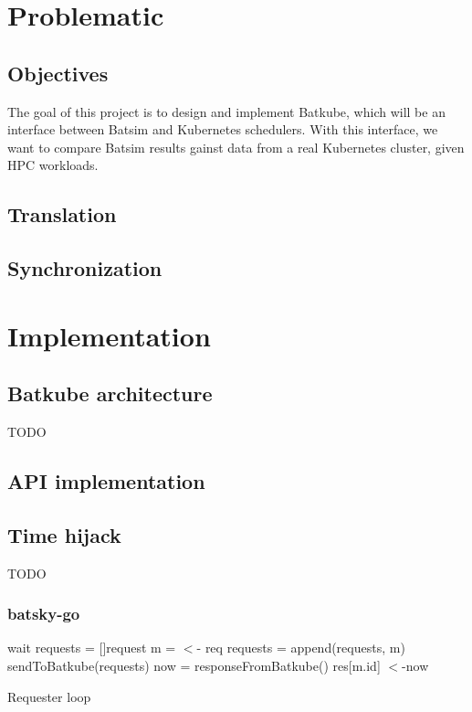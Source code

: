 \documentclass[12pt]{report}
\begin{document}
\chapter{Problematic}

\section{Objectives}

The goal of this project is to design and implement Batkube, which will be an
interface between Batsim and Kubernetes schedulers. With this interface, we
want to compare Batsim results gainst data from a real Kubernetes cluster,
given HPC workloads.

\section{Translation}

\section{Synchronization}

\chapter{Implementation}

\section{Batkube architecture}
TODO

\section{API implementation}
\section{Time hijack}
TODO

\subsection{batsky-go}


\begin{algorithm}[H]
\DontPrintSemicolon
{}
 {
	wait\;
}
requests = []request\;
 {
	m = $<$- req 
	requests = append(requests, m)\;
}
sendToBatkube(requests) 
now = responseFromBatkube()\;
 {
	res[m.id] $<$-now 
}

	
\caption{Requester loop}
\label{alg:reqLoop}
\end{algorithm}
\end{document}
